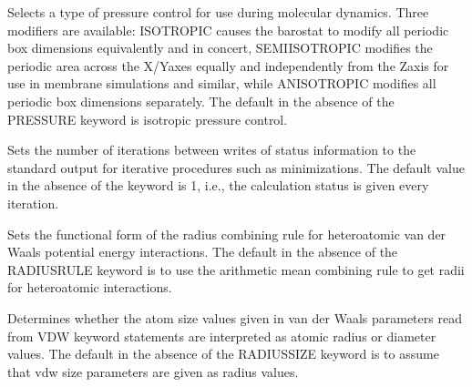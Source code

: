 \documentclass[letterpaper,11pt,english]{sphinxmanual}
\begin{document}
\ignorespaces {}\label{\detokenize{text/keywords:key-pressure}}\begin{description}
\sphinxAtStartPar
Selects a type of pressure control for use during molecular dynamics. Three modifiers are available: ISOTROPIC causes the barostat to modify all periodic box dimensions equivalently and in concert, SEMI\sphinxhyphen{}ISOTROPIC modifies the periodic area across the X/Y\sphinxhyphen{}axes equally and independently from the Z\sphinxhyphen{}axis for use in membrane simulations and similar, while ANISOTROPIC modifies all periodic box dimensions separately. The default in the absence of the PRESSURE keyword is isotropic pressure control.

\end{description}

\ignorespaces {}\label{\detokenize{text/keywords:key-printout}}\begin{description}
\sphinxAtStartPar
Sets the number of iterations between writes of status information to the standard output for iterative procedures such as minimizations. The default value in the absence of the keyword is 1, i.e., the calculation status is given every iteration.

\end{description}

\ignorespaces {}\label{\detokenize{text/keywords:key-radiusrule}}\begin{description}
\sphinxAtStartPar
Sets the functional form of the radius combining rule for heteroatomic van der Waals potential energy interactions. The default in the absence of the RADIUSRULE keyword is to use the arithmetic mean combining rule to get radii for heteroatomic interactions.

\end{description}

\ignorespaces {}\label{\detokenize{text/keywords:key-radiussize}}\begin{description}
\sphinxAtStartPar
Determines whether the atom size values given in van der Waals parameters read from VDW keyword statements are interpreted as atomic radius or diameter values. The default in the absence of the RADIUSSIZE keyword is to assume that vdw size parameters are given as radius values.

\end{description}
\end{document}
